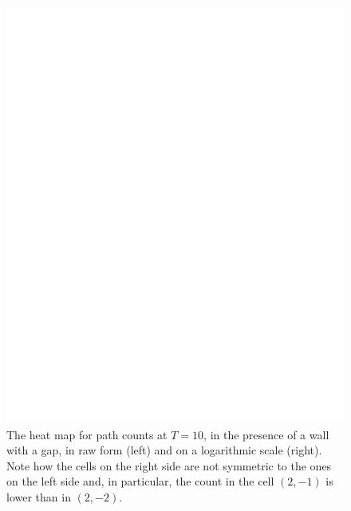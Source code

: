 \documentclass[11pt,a4paper,twoside,british]{article}
\begin{document}
\begin{figure}[p]
\includegraphics{dummy.png}
\caption{The heat map for path counts at $T = 10$, in the presence of a wall
with a gap, in raw form (left) and on a logarithmic scale (right).
Note how the cells on the right side are not symmetric to the ones on the left
side and, in particular, the count in the cell $(2, -1)$ is lower than in
$(2, -2)$.}
\label{fig:wall_gap}
\end{figure}
\end{document}
